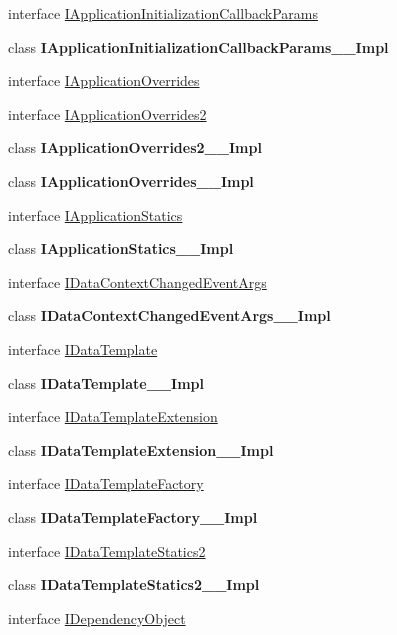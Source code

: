 \begin{DoxyCompactItemize}
\item 
interface \hyperlink{interface_windows_1_1_u_i_1_1_xaml_1_1_i_application_initialization_callback_params}{I\+Application\+Initialization\+Callback\+Params}
\item 
class {\bfseries I\+Application\+Initialization\+Callback\+Params\+\_\+\+\_\+\+Impl}
\item 
interface \hyperlink{interface_windows_1_1_u_i_1_1_xaml_1_1_i_application_overrides}{I\+Application\+Overrides}
\item 
interface \hyperlink{interface_windows_1_1_u_i_1_1_xaml_1_1_i_application_overrides2}{I\+Application\+Overrides2}
\item 
class {\bfseries I\+Application\+Overrides2\+\_\+\+\_\+\+Impl}
\item 
class {\bfseries I\+Application\+Overrides\+\_\+\+\_\+\+Impl}
\item 
interface \hyperlink{interface_windows_1_1_u_i_1_1_xaml_1_1_i_application_statics}{I\+Application\+Statics}
\item 
class {\bfseries I\+Application\+Statics\+\_\+\+\_\+\+Impl}
\item 
interface \hyperlink{interface_windows_1_1_u_i_1_1_xaml_1_1_i_data_context_changed_event_args}{I\+Data\+Context\+Changed\+Event\+Args}
\item 
class {\bfseries I\+Data\+Context\+Changed\+Event\+Args\+\_\+\+\_\+\+Impl}
\item 
interface \hyperlink{interface_windows_1_1_u_i_1_1_xaml_1_1_i_data_template}{I\+Data\+Template}
\item 
class {\bfseries I\+Data\+Template\+\_\+\+\_\+\+Impl}
\item 
interface \hyperlink{interface_windows_1_1_u_i_1_1_xaml_1_1_i_data_template_extension}{I\+Data\+Template\+Extension}
\item 
class {\bfseries I\+Data\+Template\+Extension\+\_\+\+\_\+\+Impl}
\item 
interface \hyperlink{interface_windows_1_1_u_i_1_1_xaml_1_1_i_data_template_factory}{I\+Data\+Template\+Factory}
\item 
class {\bfseries I\+Data\+Template\+Factory\+\_\+\+\_\+\+Impl}
\item 
interface \hyperlink{interface_windows_1_1_u_i_1_1_xaml_1_1_i_data_template_statics2}{I\+Data\+Template\+Statics2}
\item 
class {\bfseries I\+Data\+Template\+Statics2\+\_\+\+\_\+\+Impl}
\item 
interface \hyperlink{interface_windows_1_1_u_i_1_1_xaml_1_1_i_dependency_object}{I\+Dependency\+Object}

\end{DoxyCompactItemize}
